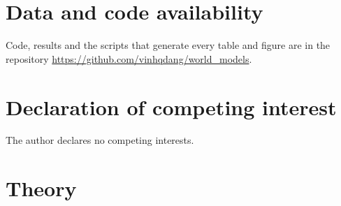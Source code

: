 \documentclass[preprint,12pt]{elsarticle}
\begin{document}
\section*{Data and code availability}
Code, results and the scripts that generate every table and figure are in the repository \url{https://github.com/vinhqdang/world_models}.

\section*{Declaration of competing interest}
The author declares no competing interests.

\appendix
\section{Theory}\label{app:theory}




\end{document}
